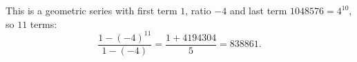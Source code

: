 This is a geometric series with first term $1$, ratio $-4$ and last term $1048576=4^{10}$, so $11$ terms:
\[\dfrac{1-(-4)^{11}}{1-(-4)}=\dfrac{1+4194304}{5}=\boxed{838861}.\]
